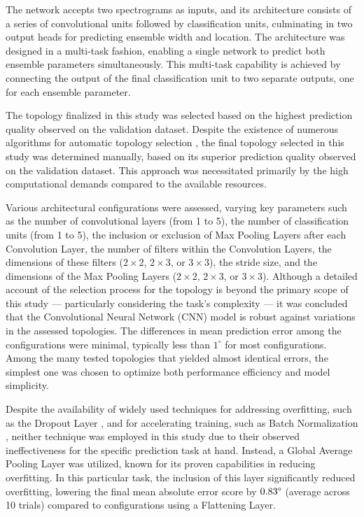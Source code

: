 \documentclass{article}
\begin{document}
The network accepts two spectrograms as inputs, and its architecture consists of a series of convolutional units followed by classification units, culminating in two output heads for predicting ensemble width and location. The architecture was designed in a multi-task fashion, enabling a single network to predict both ensemble parameters simultaneously. This multi-task capability is achieved by connecting the output of the final classification unit to two separate outputs, one for each ensemble parameter.

The topology finalized in this study was selected based on the highest prediction quality observed on the validation dataset. Despite the existence of numerous algorithms for automatic topology selection \parencite{branke_evolutionary_1995, zhang_finding_2018, miikkulainen_evolving_2017, stanley_evolving_2002, shafiee_deep_2016}, the final topology selected in this study was determined manually, based on its superior prediction quality observed on the validation dataset. This approach was necessitated primarily by the high computational demands compared to the available resources.

Various architectural configurations were assessed, varying key parameters such as the number of convolutional layers (from 1 to 5), the number of classification units (from 1 to 5), the inclusion or exclusion of Max Pooling Layers after each Convolution Layer, the number of filters within the Convolution Layers, the dimensions of these filters ($2 \times 2$, $2 \times 3$, or $3 \times 3$), the stride size, and the dimensions of the Max Pooling Layers ($2 \times 2$, $2 \times 3$, or $3 \times 3$). Although a detailed account of the selection process for the topology is beyond the primary scope of this study --- particularly considering the task's complexity --- it was concluded that the Convolutional Neural Network (CNN) model is robust against variations in the assessed topologies. The differences in mean prediction error among the configurations were minimal, typically less than $1^\circ$ for most configurations. Among the many tested topologies that yielded almost identical errors, the simplest one was chosen to optimize both performance efficiency and model simplicity.

Despite the availability of widely used techniques for addressing overfitting, such as the Dropout Layer \parencite{srivastava_dropout_2014}, and for accelerating training, such as Batch Normalization \parencite{ioffe_batch_2015}, neither technique was employed in this study due to their observed ineffectiveness for the specific prediction task at hand. Instead, a Global Average Pooling Layer \parencite{lin_network_2013} was utilized, known for its proven capabilities in reducing overfitting. In this particular task, the inclusion of this layer significantly reduced overfitting, lowering the final mean absolute error score by $0.83\degree$ (average across 10 trials) compared to configurations using a Flattening Layer.
\end{document}

